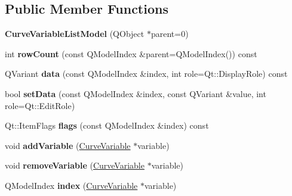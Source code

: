 \subsection*{\-Public \-Member \-Functions}
\begin{DoxyCompactItemize}
\item 
\hypertarget{class_curve_variable_list_model_ac3111a693be9de07e31fef312cbfd929}{
{\bfseries \-Curve\-Variable\-List\-Model} (\-Q\-Object $\ast$parent=0)}
\label{class_curve_variable_list_model_ac3111a693be9de07e31fef312cbfd929}

\item 
\hypertarget{class_curve_variable_list_model_a91595ae0715cdd0fa06c093aa143cccd}{
int {\bfseries row\-Count} (const \-Q\-Model\-Index \&parent=\-Q\-Model\-Index()) const }
\label{class_curve_variable_list_model_a91595ae0715cdd0fa06c093aa143cccd}

\item 
\hypertarget{class_curve_variable_list_model_a7c08fe8d39bb4e62e3afab6b546ead5a}{
\-Q\-Variant {\bfseries data} (const \-Q\-Model\-Index \&index, int role=\-Qt\-::\-Display\-Role) const }
\label{class_curve_variable_list_model_a7c08fe8d39bb4e62e3afab6b546ead5a}

\item 
\hypertarget{class_curve_variable_list_model_ac5f41f7b2ee08c289b7387bfa7c40512}{
bool {\bfseries set\-Data} (const \-Q\-Model\-Index \&index, const \-Q\-Variant \&value, int role=\-Qt\-::\-Edit\-Role)}
\label{class_curve_variable_list_model_ac5f41f7b2ee08c289b7387bfa7c40512}

\item 
\hypertarget{class_curve_variable_list_model_a7269d8ab2f379c79111ef3f18a76041e}{
\-Qt\-::\-Item\-Flags {\bfseries flags} (const \-Q\-Model\-Index \&index) const }
\label{class_curve_variable_list_model_a7269d8ab2f379c79111ef3f18a76041e}

\item 
\hypertarget{class_curve_variable_list_model_a096b13113a64f7cf0b2545efa3d85b32}{
void {\bfseries add\-Variable} (\hyperlink{class_curve_variable}{\-Curve\-Variable} $\ast$variable)}
\label{class_curve_variable_list_model_a096b13113a64f7cf0b2545efa3d85b32}

\item 
\hypertarget{class_curve_variable_list_model_aeae06724e3b8b799ebfe491cb96ccf15}{
void {\bfseries remove\-Variable} (\hyperlink{class_curve_variable}{\-Curve\-Variable} $\ast$variable)}
\label{class_curve_variable_list_model_aeae06724e3b8b799ebfe491cb96ccf15}

\item 
\hypertarget{class_curve_variable_list_model_ab1dce7ee336faa824b1b5bebaf43dfff}{
\-Q\-Model\-Index {\bfseries index} (\hyperlink{class_curve_variable}{\-Curve\-Variable} $\ast$variable)}
\label{class_curve_variable_list_model_ab1dce7ee336faa824b1b5bebaf43dfff}

\end{DoxyCompactItemize}
